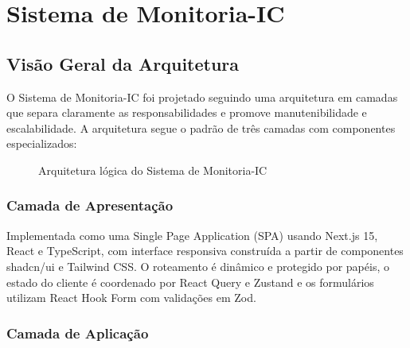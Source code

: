 \documentclass[portuguese]{sbc2025}%
\begin{document}
\section{Sistema de Monitoria-IC}
\label{sec:system}

\subsection{Visão Geral da Arquitetura}

O Sistema de Monitoria-IC foi projetado seguindo uma arquitetura em camadas que separa claramente as responsabilidades e promove manutenibilidade e escalabilidade. A arquitetura segue o padrão de três camadas com componentes especializados:

\begin{figure}[h!]
  \centering
  \caption{Arquitetura lógica do Sistema de Monitoria-IC}
  \label{fig:architecture}
\end{figure}

\subsubsection{Camada de Apresentação}

Implementada como uma Single Page Application (SPA) usando Next.js 15, React e TypeScript, com interface responsiva construída a partir de componentes shadcn/ui e Tailwind CSS. O roteamento é dinâmico e protegido por papéis, o estado do cliente é coordenado por React Query e Zustand e os formulários utilizam React Hook Form com validações em Zod.

\subsubsection{Camada de Aplicação}
\end{document}
